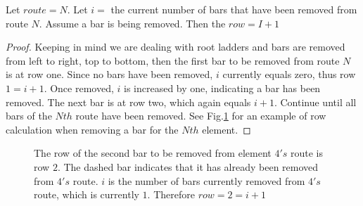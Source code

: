 \begin{lemma}
  Let $route=N$. Let $i=$ the current number of bars that have been removed from route $N$. Assume a bar is being removed. 
  Then the $row=I+1$
\end{lemma}
\begin{proof}
  Keeping in mind we are dealing with root ladders and bars are removed from left to right, top to bottom, then the first bar to 
  be removed from route $N$ is at row one. Since no bars have been removed, $i$ currently equals zero, 
  thus row $1=i+1$. Once removed, $i$ is increased by one, indicating a bar has been removed. The next bar is at row two, 
  which again equals $i+1$. Continue until all bars of the $Nth$ route have been removed. See Fig.\ref{fig:SJTcase3} for an example 
  of row calculation when removing a bar for the $Nth$ element.
\end{proof}
\begin{figure}[!htp]
  \begin{center}
  \end{center}
  \caption{The row of the second bar to be removed from element $4's$ route is row $2$. The dashed bar indicates that it has already been 
  removed from $4's$ route. $i$ is the number of bars currently removed from $4's$ route, which is currently $1$. Therefore $row=2=i+1$}
  \label{fig:SJTcase3}
\end{figure}



